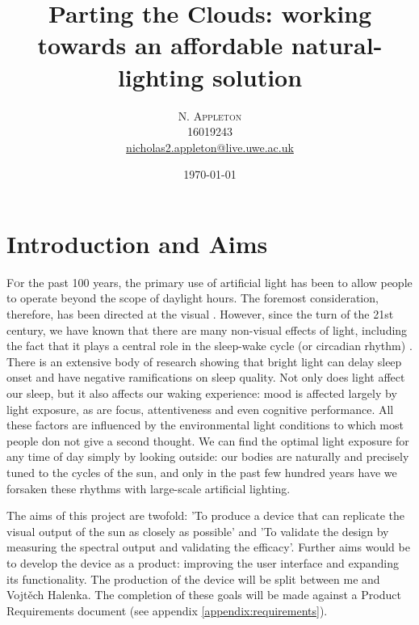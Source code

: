 \documentclass[twoside,twocolumn]{article}
\title{Parting the Clouds: working towards an affordable natural-lighting solution} %
\author{%
\textsc{N. Appleton} \\[1ex] %
\normalsize 16019243 \\ %
\normalsize \href{mailto:nicholas2.appleton@live.uwe.ac.uk}{nicholas2.appleton@live.uwe.ac.uk} %
}
\date{\today} %
\begin{document}
\maketitle


\section{Introduction and Aims}
\label{sec:intro}

\lettrine[nindent=0em,lines=3]{F} or the past 100 years, the primary use of artificial light has been to allow people to operate beyond the scope of daylight hours. The foremost consideration, therefore, has been directed at the visual \citep{webbConsiderationsLightingBuilt2006}. However, since the turn of the 21st century, we have known that there are many non-visual effects of light, including the fact that it plays a central role in the sleep-wake cycle (or circadian rhythm) \citep{provencioNovelHumanOpsin2000, bersonPhototransductionRetinalGanglion2002}. 
There is an extensive body of research showing that bright light can delay sleep onset and have negative ramifications on sleep quality. 
Not only does light affect our sleep, but it also affects our waking experience: mood is affected largely by light exposure, as are focus, attentiveness and even cognitive performance. All these factors are influenced by the environmental light conditions to which most people don not give a second thought.
We can find the optimal light exposure for any time of day simply by looking outside: our bodies are naturally and precisely	 tuned to the cycles of the sun, and only in the past few hundred years have we forsaken these rhythms with large-scale artificial lighting.

The aims of this project are twofold: 'To produce a device that can replicate the visual output of the sun as closely as possible' and 'To validate the design by measuring the spectral output and validating the efficacy'. Further aims would be to develop the device as a product: improving the user interface and expanding its functionality. The production of the device will be split between me and Vojtěch Halenka. The completion of these goals will be made against a Product Requirements document (see appendix \ref{appendix:requirements}).
\end{document}
